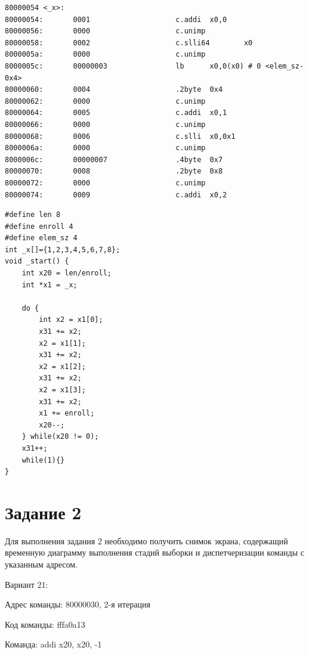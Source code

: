 \begin{lstlisting}[label={common_disasm}, caption=Дизассеблированный код программы для варианта 21]
80000054 <_x>:
80000054:       0001                    c.addi  x0,0
80000056:       0000                    c.unimp
80000058:       0002                    c.slli64        x0
8000005a:       0000                    c.unimp
8000005c:       00000003                lb      x0,0(x0) # 0 <elem_sz-0x4>
80000060:       0004                    .2byte  0x4
80000062:       0000                    c.unimp
80000064:       0005                    c.addi  x0,1
80000066:       0000                    c.unimp
80000068:       0006                    c.slli  x0,0x1
8000006a:       0000                    c.unimp
8000006c:       00000007                .4byte  0x7
80000070:       0008                    .2byte  0x8
80000072:       0000                    c.unimp
80000074:       0009                    c.addi  x0,2
\end{lstlisting}

\begin{lstlisting}[label={common_c}, caption=Псевдокод на языке C эквивалентной программы]
#define len 8
#define enroll 4
#define elem_sz 4
int _x[]={1,2,3,4,5,6,7,8};
void _start() {
    int x20 = len/enroll;
    int *x1 = _x;

    do {
        int x2 = x1[0];
        x31 += x2;
        x2 = x1[1];
        x31 += x2;
        x2 = x1[2];
        x31 += x2;
        x2 = x1[3];
        x31 += x2;
        x1 += enroll;
        x20--;
    } while(x20 != 0);
    x31++;
    while(1){}
}
\end{lstlisting}

\clearpage

\section{Задание 2}

Для выполнения задания 2 необходимо получить снимок экрана, 
содер\-жащий временную диаграмму выполнения стадий выборки и 
диспетчериза\-ции команды с указанным адресом.

Вариант 21:

\hspace{1cm} Адрес команды: 80000030, 2-я итерация

\hspace{1cm} Код команды: fffa0a13

\hspace{1cm} Команда: addi x20, x20, -1

